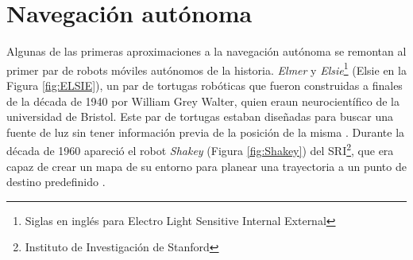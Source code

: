\section{Navegación autónoma}
\label{sec:na}
Algunas de las primeras aproximaciones a la navegación autónoma se remontan al primer par de robots móviles autónomos de la historia. {\it Elmer} y {\it Elsie}\footnote{Siglas en inglés para Electro Light Sensitive Internal External} (Elsie  en la Figura \ref{fig:ELSIE}), un par de tortugas robóticas que fueron construidas a finales de la década de 1940 por William Grey Walter, quien eraun neurocientífico de la universidad de Bristol. Este par de tortugas estaban diseñadas para buscar una fuente de luz sin tener información previa de la posición de la misma \cite{w.greyMachineThatLearns1951}. Durante la década de 1960 apareció el robot {\it Shakey} (Figura \ref{fig:Shakey}) del SRI\footnote{Instituto de Investigación de Stanford}, que era capaz de crear un mapa de su entorno para planear una trayectoria a un punto de destino predefinido \cite{nilsonn.j.ShakeyRobot1984}.
